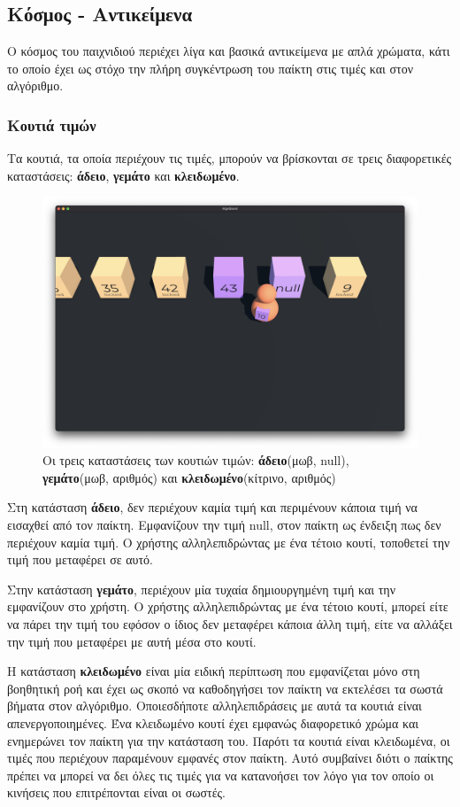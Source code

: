\subsection{Κόσμος - Αντικείμενα}

Ο κόσμος του παιχνιδιού περιέχει λίγα και βασικά αντικείμενα με απλά χρώματα, κάτι το οποίο έχει ως στόχο την πλήρη συγκέντρωση του παίκτη στις τιμές και στον αλγόριθμο.

\subsubsection{Κουτιά τιμών}

Τα κουτιά, τα οποία περιέχουν τις τιμές, μπορούν να βρίσκονται σε τρεις διαφορετικές καταστάσεις: \textbf{άδειο}, \textbf{γεμάτο} και \textbf{κλειδωμένο}.

\begin{figure}[H]
    \centering
    \includegraphics[width=0.7\linewidth]{sections/4/3/images/game_container_states}
    \caption{Οι τρεις καταστάσεις των κουτιών τιμών: \textbf{άδειο}(μωβ, \gls{null}), \textbf{γεμάτο}(μωβ, αριθμός) και \textbf{κλειδωμένο}(κίτρινο, αριθμός)}
    \label{fig:game_container_states}
\end{figure}

Στη κατάσταση \textbf{άδειο}, δεν περιέχουν καμία τιμή και περιμένουν κάποια τιμή να εισαχθεί από τον παίκτη. Εμφανίζουν την τιμή \gls{null}, στον παίκτη ως ένδειξη πως δεν περιέχουν καμία τιμή. Ο χρήστης αλληλεπιδρώντας με ένα τέτοιο κουτί, τοποθετεί την τιμή που μεταφέρει σε αυτό.

Στην κατάσταση \textbf{γεμάτο}, περιέχουν μία τυχαία δημιουργημένη τιμή και την εμφανίζουν στο χρήστη. Ο χρήστης αλληλεπιδρώντας με ένα τέτοιο κουτί, μπορεί είτε να πάρει την τιμή του εφόσον ο ίδιος δεν μεταφέρει κάποια άλλη τιμή, είτε να αλλάξει την τιμή που μεταφέρει με αυτή μέσα στο κουτί.

Η κατάσταση \textbf{κλειδωμένο} είναι μία ειδική περίπτωση που εμφανίζεται μόνο στη βοηθητική ροή και έχει ως σκοπό να καθοδηγήσει τον παίκτη να εκτελέσει τα σωστά βήματα στον αλγόριθμο. Οποιεσδήποτε αλληλεπιδράσεις με αυτά τα κουτιά είναι απενεργοποιημένες. Ένα κλειδωμένο κουτί έχει εμφανώς διαφορετικό χρώμα και ενημερώνει τον παίκτη για την κατάσταση του. Παρότι τα κουτιά είναι κλειδωμένα, οι τιμές που περιέχουν παραμένουν εμφανές στον παίκτη. Αυτό συμβαίνει διότι ο παίκτης πρέπει να μπορεί να δει όλες τις τιμές για να κατανοήσει τον λόγο για τον οποίο οι κινήσεις που επιτρέπονται είναι οι σωστές.

